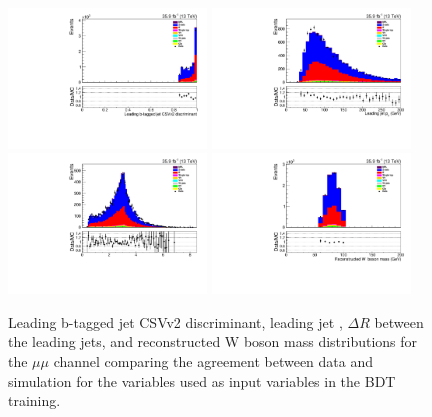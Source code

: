 \begin{figure}[htb]
\centering
\includegraphics[width=0.47\textwidth]{figs/background-estimation/plots/unblinded/prompt_mumu_ttbarInc/bTagDisc_NPL_mumu_wMass_mumu.pdf}
\includegraphics[width=0.47\textwidth]{figs/background-estimation/plots/unblinded/prompt_mumu_ttbarInc/leadingJetPt_NPL_mumu_wMass_mumu.pdf}
\\
\includegraphics[width=0.47\textwidth]{figs/background-estimation/plots/unblinded/prompt_mumu_ttbarInc/jjDelR_NPL_mumu_wMass_mumu.pdf}
\includegraphics[width=0.47\textwidth]{figs/background-estimation/plots/unblinded/prompt_mumu_ttbarInc/wPairMass_NPL_mumu_wMass_mumu.pdf}
\caption{
Leading b-tagged jet CSVv2 discriminant, leading jet \pT, $\Delta R$ between the leading jets, and reconstructed W boson mass distributions for the $\mu\mu$ channel comparing the agreement between data and simulation for the variables used as input variables in the BDT training.}
\label{fig:inputFeaturesDataSimAgreement2}
\end{figure}

